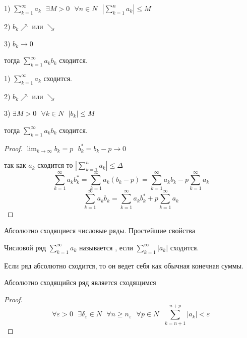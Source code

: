 \begin{block}
  1) $\sum_{k=1}^{\infty} a_k ~~~ \exists M > 0 ~~~ \forall n \in N ~~~
  |\sum_{k=1}^n a_k| \le M$

  2) $b_k \nearrow$ или $\searrow$

  3) $b_k \to 0$

  тогда $\sum_{k=1}^{\infty} a_k b_k$ сходится.
\end{block}

\begin{block}
  1) $\sum_{k=1}^{\infty} a_k$ сходится.

  2) $b_k \nearrow$ или $\searrow$

  3) $\exists M > 0 ~~~ \forall k \in N ~~~ |b_k| \le M$

  тогда $\sum_{k=1}^{\infty} a_k b_k$ сходится.
\end{block}

\begin{proof}
  $\lim_{k \to \infty} b_k = p ~~~ b_k^* = b_k - p \to 0$

  так как $a_k$ сходится то $| \sum_{k=1}^n a_k | \le \Delta$
  $$
  \sum_{k=1}^{\infty} a_k b_k^* = \sum_{k=1}^{\infty} a_k (b_k - p) =
  \sum_{k=1}^{\infty} a_k b_k - p \sum_{k=1}^{\infty} a_k
  $$
  $$
  \sum_{k=1}^{\infty} a_k b_k = \sum_{k=1}^{\infty} a_k b_k^* +
  p\sum_{k=1}^{\infty} a_k
  $$
\end{proof}

\begin{title}[\Large]
  Абсолютно сходящиеся числовые ряды. Простейшие свойства
\end{title}

\begin{defin}
  Числовой ряд $\sum_{k=1}^{\infty} a_k$ называется ,
  если $\sum_{k=1}^{\infty} |a_k|$ сходится.
\end{defin}

\begin{block}[Свойство]
  Если ряд абсолютно сходится, то он ведет себя как обычная конечная суммы.
\end{block}

\begin{theorem}
  Абсолютно сходящийся ряд является сходящимся
\end{theorem}

\begin{proof}
  $$
  \forall \varepsilon > 0 ~~~ \exists \delta_{\varepsilon} \in N ~~~
  \forall n \ge n_{\varepsilon} ~~~ \forall p \in N ~~~
  \sum_{k=n+1}^{n+p} |a_k| < \varepsilon
  $$
\end{proof}

